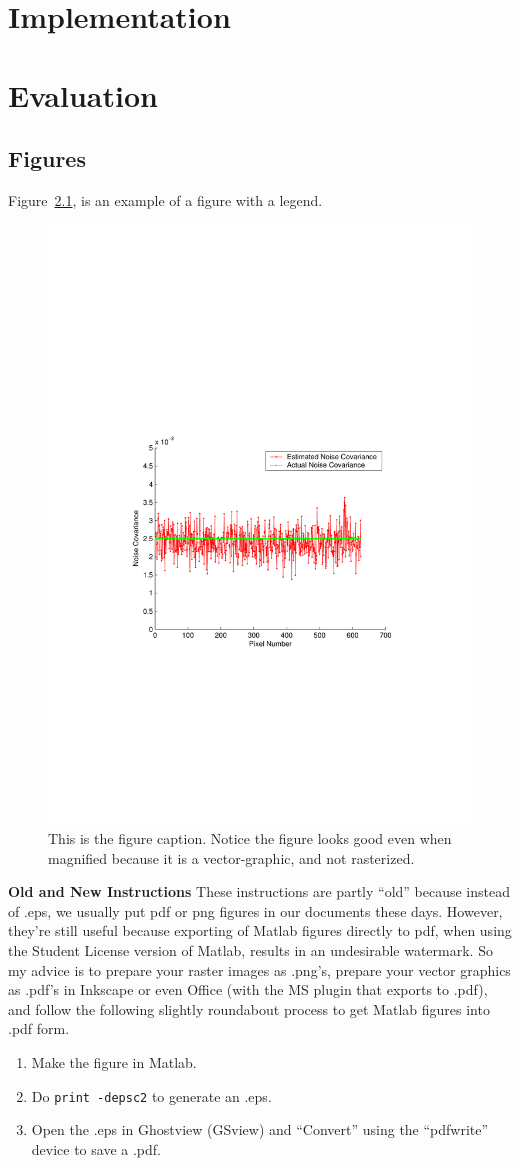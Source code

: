 \documentclass[12pt]{ucl_thesis}
\begin{document}
\chapter{Implementation}
\label{chp:impl}






\chapter{Evaluation}
\label{chp:eval}
%


\section{Figures} \label{sectionExample}

Figure~\ref{ExampleEstNoiseCovar}, is an example of a figure with a legend.

\begin{figure}[h]
\centering
\includegraphics[width=0.5\linewidth]{exampleEstNoiseCovar}
\caption{This is the figure caption. Notice the figure looks good even when magnified because it is a vector-graphic, and not rasterized.} \label{ExampleEstNoiseCovar}
\end{figure}


\textbf{Old and New Instructions} These instructions are partly ``old'' because instead of .eps, we usually put pdf or png figures in our documents these days. However, they're still useful because exporting of Matlab figures directly to pdf, when using the Student License version of Matlab, results in an undesirable watermark. So my advice is to prepare your raster images as .png's, prepare your vector graphics as .pdf's in Inkscape or even Office (with the MS plugin that exports to .pdf), and follow the following slightly roundabout process to get Matlab figures into .pdf form.
\begin{enumerate}
  \item Make the figure in Matlab.
  \item Do \texttt{print -depsc2} to generate an .eps.
  \item Open the .eps in Ghostview (GSview) and ``Convert'' using the ``pdfwrite'' device to save a .pdf.
\end{enumerate}
\end{document}
